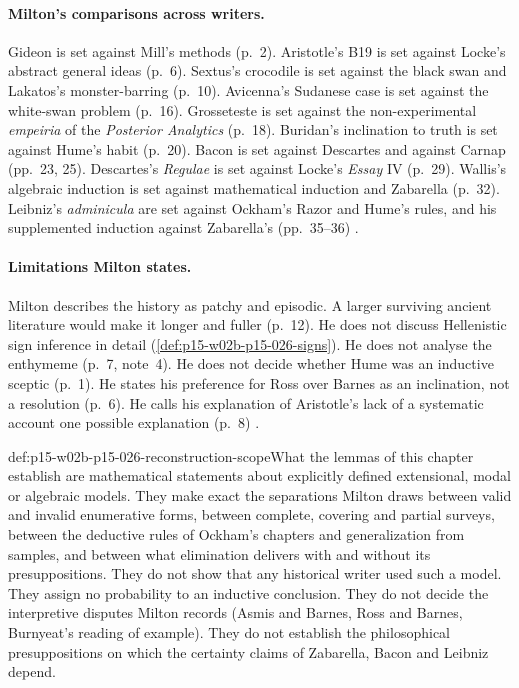 \paragraph{Milton's comparisons across writers.}
Gideon is set against Mill's methods (p.~2). Aristotle's B19 is set against
Locke's abstract general ideas (p.~6). Sextus's crocodile is set against the
black swan and Lakatos's monster-barring (p.~10). Avicenna's Sudanese case
is set against the white-swan problem (p.~16). Grosseteste is set against
the non-experimental \emph{empeiria} of the \emph{Posterior Analytics}
(p.~18). Buridan's inclination to truth is set against Hume's habit (p.~20).
Bacon is set against Descartes and against Carnap (pp.~23, 25).
Descartes's \emph{Regulae} is set against Locke's \emph{Essay} IV (p.~29).
Wallis's algebraic induction is set against mathematical induction and
Zabarella (p.~32). Leibniz's \emph{adminicula} are set against Ockham's
Razor and Hume's rules, and his supplemented induction against Zabarella's
(pp.~35--36)
\cite[pp.~2--36]{Milton2011InductionBeforeHume}.

\paragraph{Limitations Milton states.}
Milton describes the history as patchy and episodic. A larger surviving
ancient literature would make it longer and fuller (p.~12). He does not
discuss Hellenistic sign inference in detail
(\cref{def:p15-w02b-p15-026-signs}). He does not analyse the enthymeme
(p.~7, note~4). He does not decide whether Hume was an inductive sceptic
(p.~1). He states his preference for Ross over Barnes as an inclination,
not a resolution (p.~6). He calls his explanation of Aristotle's lack of a
systematic account one possible explanation (p.~8)
\cite[pp.~1, 6--8, 12]{Milton2011InductionBeforeHume}.

\begin{proofboundary}{def:p15-w02b-p15-026-reconstruction-scope}{What the lemmas of this chapter establish}
are mathematical statements about explicitly defined extensional, modal
or algebraic models. They make exact the separations Milton draws between
valid and invalid enumerative forms, between complete, covering and partial
surveys, between the deductive rules of Ockham's chapters and
generalization from samples, and between what elimination delivers with and
without its presuppositions. They do not show that any historical writer
used such a model. They assign no probability to an inductive conclusion.
They do not decide the interpretive disputes Milton records (Asmis and
Barnes, Ross and Barnes, Burnyeat's reading of example). They do not
establish the philosophical presuppositions on which the certainty claims
of Zabarella, Bacon and Leibniz depend.
\end{proofboundary}

